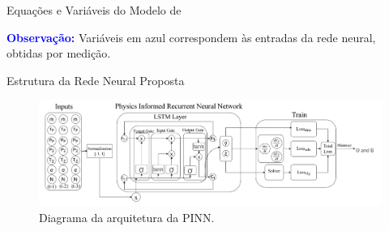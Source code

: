 \begin{frame}{Equações e Variáveis do Modelo de \cite{Meira2022} }
\begin{multicols}{2}
\begin{minipage}{\linewidth}
        \vspace{1.5cm}
        {\scriptsize \textcolor{blue}{\textbf{Observação:}} Variáveis em azul correspondem às entradas da rede neural, obtidas por medição.}
    \end{minipage}


    \end{multicols}
\end{frame}

\begin{frame}{Estrutura da Rede Neural Proposta}
    \vspace{-0.3cm}
    \begin{figure}
        \centering
        \includegraphics[width=1.0\textwidth]{figures/PIRNN.png} %
        \caption{\small Diagrama da arquitetura da PINN.}
    \end{figure}
\end{frame}
